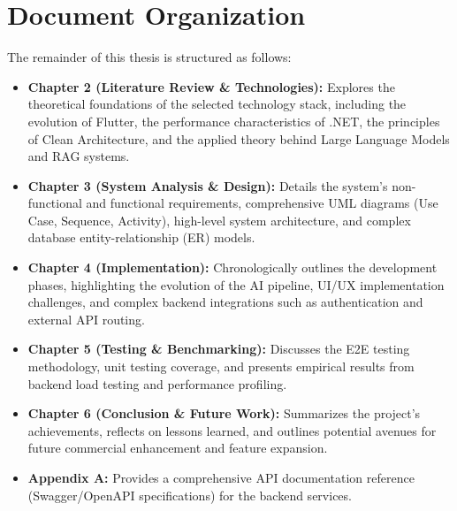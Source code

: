 \section{Document Organization}
The remainder of this thesis is structured as follows:
\begin{itemize}
    \item \textbf{Chapter 2 (Literature Review \& Technologies):} Explores the theoretical foundations of the selected technology stack, including the evolution of Flutter, the performance characteristics of .NET, the principles of Clean Architecture, and the applied theory behind Large Language Models and RAG systems.
    \item \textbf{Chapter 3 (System Analysis \& Design):} Details the system's non-functional and functional requirements, comprehensive UML diagrams (Use Case, Sequence, Activity), high-level system architecture, and complex database entity-relationship (ER) models.
    \item \textbf{Chapter 4 (Implementation):} Chronologically outlines the development phases, highlighting the evolution of the AI pipeline, UI/UX implementation challenges, and complex backend integrations such as authentication and external API routing.
    \item \textbf{Chapter 5 (Testing \& Benchmarking):} Discusses the E2E testing methodology, unit testing coverage, and presents empirical results from backend load testing and performance profiling.
    \item \textbf{Chapter 6 (Conclusion \& Future Work):} Summarizes the project's achievements, reflects on lessons learned, and outlines potential avenues for future commercial enhancement and feature expansion.
    \item \textbf{Appendix A:} Provides a comprehensive API documentation reference (Swagger/OpenAPI specifications) for the backend services.
\end{itemize}

